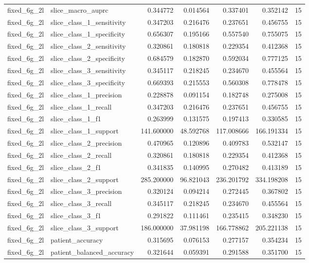 \begin{tabular}{llrrrrr}
fixed_6g_2l & slice_macro_auprc & 0.344772 & 0.014564 & 0.337401 & 0.352142 & 15 \\
fixed_6g_2l & slice_class_1_sensitivity & 0.347203 & 0.216476 & 0.237651 & 0.456755 & 15 \\
fixed_6g_2l & slice_class_1_specificity & 0.656307 & 0.195166 & 0.557540 & 0.755075 & 15 \\
fixed_6g_2l & slice_class_2_sensitivity & 0.320861 & 0.180818 & 0.229354 & 0.412368 & 15 \\
fixed_6g_2l & slice_class_2_specificity & 0.684579 & 0.182870 & 0.592034 & 0.777125 & 15 \\
fixed_6g_2l & slice_class_3_sensitivity & 0.345117 & 0.218245 & 0.234670 & 0.455564 & 15 \\
fixed_6g_2l & slice_class_3_specificity & 0.669393 & 0.215553 & 0.560308 & 0.778478 & 15 \\
fixed_6g_2l & slice_class_1_precision & 0.228878 & 0.091154 & 0.182748 & 0.275008 & 15 \\
fixed_6g_2l & slice_class_1_recall & 0.347203 & 0.216476 & 0.237651 & 0.456755 & 15 \\
fixed_6g_2l & slice_class_1_f1 & 0.263999 & 0.131575 & 0.197413 & 0.330585 & 15 \\
fixed_6g_2l & slice_class_1_support & 141.600000 & 48.592768 & 117.008666 & 166.191334 & 15 \\
fixed_6g_2l & slice_class_2_precision & 0.470965 & 0.120896 & 0.409783 & 0.532147 & 15 \\
fixed_6g_2l & slice_class_2_recall & 0.320861 & 0.180818 & 0.229354 & 0.412368 & 15 \\
fixed_6g_2l & slice_class_2_f1 & 0.341835 & 0.140995 & 0.270482 & 0.413189 & 15 \\
fixed_6g_2l & slice_class_2_support & 285.200000 & 96.821043 & 236.201792 & 334.198208 & 15 \\
fixed_6g_2l & slice_class_3_precision & 0.320124 & 0.094214 & 0.272445 & 0.367802 & 15 \\
fixed_6g_2l & slice_class_3_recall & 0.345117 & 0.218245 & 0.234670 & 0.455564 & 15 \\
fixed_6g_2l & slice_class_3_f1 & 0.291822 & 0.111461 & 0.235415 & 0.348230 & 15 \\
fixed_6g_2l & slice_class_3_support & 186.000000 & 37.981198 & 166.778862 & 205.221138 & 15 \\
fixed_6g_2l & patient_accuracy & 0.315695 & 0.076153 & 0.277157 & 0.354234 & 15 \\
fixed_6g_2l & patient_balanced_accuracy & 0.321644 & 0.059391 & 0.291588 & 0.351700 & 15 \\

\end{tabular}
